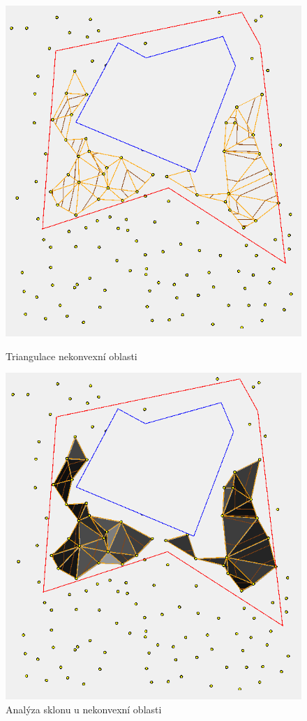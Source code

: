 \documentclass{article}
\begin{document}
\begin{spacing}{1.5}
\begin{figure}[!htb]
    \centering
    \includegraphics[width=0.7\linewidth]{images/nonconvex1.png}
    \caption{Triangulace nekonvexní oblasti}
    \label{fig:enter-label}
\endminipage\hfill
{}
    \centering
    \includegraphics[width=0.7\linewidth]{images/nonconvex2.png}
    \caption{Analýza sklonu u nekonvexní oblasti}
    \label{fig:enter-label}
\endminipage\hfill

\end{figure}


\end{spacing}
\end{document}
